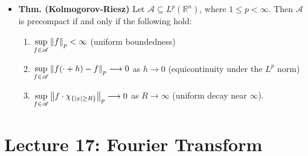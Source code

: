 \documentclass{article}
\begin{document}
\begin{itemize}
\begin{solutions}
\begin{enumerate}[itemsep =-2pt,label = (\arabic{*})]
				\begin{align}
					\begin{split}
						\norm{f_{\epsilon} - f}_{p}^{p} &= \int \abs{\int [f(x -y) - f(x)]\rho_{\epsilon}(y)\;dy}^{p}\;dx \\ 
						&\leq \int \left(\int \abs{f(x -y) - f(x)}\rho_{\epsilon}(y)\;dy\right)^{p}\;dx \\
						&\leq \left[\int \left[\int |f(x - y)- f(x)|^{p}\rho_{\epsilon}^{p}(y)\;dx\right]^{1/p}dy\right]^{p} \\
						&= \left[\int \left[\int |f(x - y) - f(x)|^{p}\;dx\right]^{1/p}\rho_{\epsilon}(y)\;dy\right]^{p} \\
						&\leq \left[\int 2\norm{f}_{p}\rho_{\epsilon}(y)\;dy\right]^{p} \\
						\implies 
						\norm{f_{\epsilon} - f}_{p} & \leq \int 2\norm{f}_{p} \rho_{\epsilon}(y)\;dy. 
					\end{split}
				\end{align}
			Now we note that $2\norm{f}_{p}\rho_{\epsilon}(y) \to 0$ a.e. and $2\norm{f}_{p}\rho_{\epsilon}(y) \leq 2\norm{f}_{p}\norm{\rho}_{\infty}\chi_{B_{R}(0)} \in L^{1}$ (as in the proof of (1)). Hence, by the Dominated Convergence Theorem, we conclude that $\lim_{\epsilon \to 0}\norm{f_{\epsilon} - f}_{p} = 0$. 
		\end{enumerate}
	\end{solutions}
 
	\item \textbf{Thm. (Kolmogorov-Riesz)} Let $\mathscr{A} \subseteq L^{p}(\mathbb{R}^{n})$, where $1 \leq p < \infty$. Then $\mathscr{A}$ is precompact if and only if the following hold: \vspace{-0.15cm}
	\begin{enumerate}[itemsep =-2pt,label = (\arabic{*})]
		\item $\sup\limits_{f \in \mathscr{A}}\left\Vert f \right\Vert_{p} < \infty$ (uniform boundedness) 
		\item $\sup\limits_{f \in \mathscr{A}}\left\Vert f(\cdot + h) - f \right\Vert_{p} \longrightarrow 0$ as $h \to 0$ (equicontinuity under the $L^{p}$ norm)
		\item $\sup\limits_{f \in \mathscr{A}}\left\Vert f \cdot \chi_{\{|x|\geq R\}} \right\Vert_{p} \longrightarrow 0$ as $R \to \infty$ (uniform decay near $\infty$).
	\end{enumerate}
\end{itemize}


\newpage 
\section{Lecture 17: Fourier Transform} 
\end{document}
